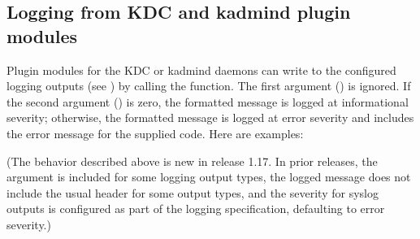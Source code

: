 \documentclass[letterpaper,10pt,english]{sphinxmanual}
\begin{document}
\subsection{Logging from KDC and kadmind plugin modules}
\label{\detokenize{plugindev/general:logging-from-kdc-and-kadmind-plugin-modules}}
\sphinxAtStartPar
Plugin modules for the KDC or kadmind daemons can write to the
configured logging outputs (see ) by calling the
 function.  The first argument () is ignored.  If
the second argument () is zero, the formatted message is logged
at informational severity; otherwise, the formatted message is logged
at error severity and includes the error message for the supplied
code.  Here are examples:

\begin{sphinxVerbatim}[commandchars=\\\{\}]
   
  
\end{sphinxVerbatim}

\sphinxAtStartPar
(The behavior described above is new in release 1.17.  In prior
releases, the  argument is included for some logging output
types, the logged message does not include the usual header for some
output types, and the severity for syslog outputs is configured as
part of the logging specification, defaulting to error severity.)

\sphinxstepscope
\end{document}

